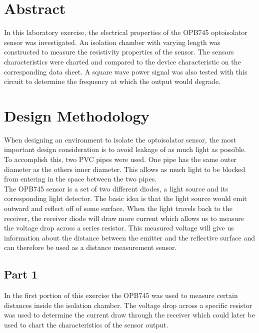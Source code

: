 \documentclass[CMPE]{../KGCOEReport}
\begin{document}
    \maketitle
    \section*{Abstract}

    In this laboratory exercise, the electrical properties of the OPB745 optoisolator
    sensor was investigated. An isolation chamber with varying length was constructed
    to measure the resistivity properties of the sensor. The sensors characteristics
    were charted and compared to the device characteristic on the corresponding data
    sheet. A square wave power signal was also tested with this circuit to determine
    the frequency at which the output would degrade.

    \section*{Design Methodology}

	When designing an environment to isolate the optoisolator sensor, the most important
	design consideration is to avoid leakage of as much light as possible. To accomplish 
	this, two PVC pipes were used. One pipe has the same outer diameter as the others
	inner diameter. This allows as much light to be blocked from entering in the space
	between the two pipes.\\

	The OPB745 sensor is a set of two different diodes, a light source and its
	corresponding light detector. The basic idea is that the light source would emit
	outward and reflect off of some surface. When the light travels back to the receiver,
	the receiver diode will draw more current which allows us to measure the voltage
	drop across a series resistor. This measured voltage will give us information about
	the distance between the emitter and the reflective surface and can therefore be used
	as a distance measurement sensor.

    \subsection*{Part 1}
    
    In the first portion of this exercise the OPB745 was used to measure certain distances
    inside the isolation chamber. The voltage drop across a specific resistor was used
    to determine the current draw through the receiver which could later be used to
    chart the characteristics of the sensor output.\\
\end{document}
